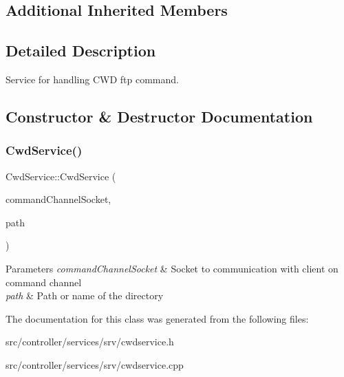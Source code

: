 \subsection*{Additional Inherited Members}


\subsection{Detailed Description}
Service for handling C\+WD ftp command. 

\subsection{Constructor \& Destructor Documentation}
\mbox{\label{classCwdService_a88204e4221cde51198702aad17cb5b31}} 
\subsubsection{\texorpdfstring{Cwd\+Service()}{CwdService()}}
{\footnotesize\ttfamily Cwd\+Service\+::\+Cwd\+Service (\begin{DoxyParamCaption}\item[{int}]{command\+Channel\+Socket,  }\item[{const Q\+String \&}]{path }\end{DoxyParamCaption})}


\begin{DoxyParams}{Parameters}
{\em command\+Channel\+Socket} & Socket to communication with client on command channel \\
\hline
{\em path} & Path or name of the directory \\
\hline
\end{DoxyParams}


The documentation for this class was generated from the following files\+:\begin{DoxyCompactItemize}
\item 
src/controller/services/srv/cwdservice.\+h\item 
src/controller/services/srv/cwdservice.\+cpp\end{DoxyCompactItemize}
